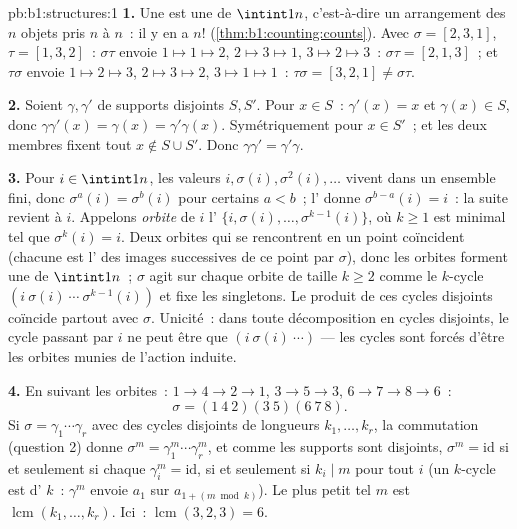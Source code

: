 \begin{solution}{pb:b1:structures:1}
\textbf{1.} Une  est une  de $\intint1n$,
c'est-à-dire un arrangement des $n$ objets pris $n$ à $n$~: il y en a
$n!$ (\cref{thm:b1:counting:counts}). Avec $\sigma = [2,3,1]$, $\tau =
[1,3,2]$~: $\sigma\tau$ envoie $1 \mapsto 1 \mapsto 2$, $2 \mapsto 3
\mapsto 1$, $3 \mapsto 2 \mapsto 3$~: $\sigma\tau = [2,1,3]$~; et
$\tau\sigma$ envoie $1 \mapsto 2 \mapsto 3$, $2 \mapsto 3 \mapsto
2$, $3 \mapsto 1 \mapsto 1$~: $\tau\sigma = [3,2,1] \neq
\sigma\tau$.

\textbf{2.} Soient $\gamma, \gamma'$ de supports disjoints $S, S'$.
Pour $x \in S$~: $\gamma'(x) = x$ et $\gamma(x) \in S$, donc
$\gamma\gamma'(x) = \gamma(x) = \gamma'\gamma(x)$. Symétriquement
pour $x \in S'$~; et les deux membres fixent tout $x \notin S \cup S'$.
Donc $\gamma\gamma' = \gamma'\gamma$.

\textbf{3.} Pour $i \in \intint1n$, les valeurs $i, \sigma(i),
\sigma^2(i), \dots$ vivent dans un ensemble fini, donc $\sigma^a(i) =
\sigma^b(i)$ pour certains $a < b$~; l' donne
$\sigma^{b-a}(i) = i$~: la suite revient à $i$. Appelons \emph{orbite}
de $i$ l' $\{i, \sigma(i), \dots, \sigma^{k-1}(i)\}$, où
$k \geq 1$ est minimal tel que $\sigma^k(i) = i$. Deux orbites qui se
rencontrent en un point coïncident (chacune est l' des images
successives de ce point par $\sigma$), donc les orbites forment une
 de $\intint1n$~; $\sigma$ agit sur chaque orbite de taille
$k \geq 2$ comme le $k$-cycle $(i\ \sigma(i)\ \cdots\
\sigma^{k-1}(i))$ et fixe les singletons. Le produit de ces cycles
disjoints coïncide partout avec $\sigma$. Unicité~: dans toute
décomposition en cycles disjoints, le cycle passant par $i$ ne peut
être que $(i\ \sigma(i)\ \cdots)$ --- les cycles sont forcés d'être les
orbites munies de l'action induite.

\textbf{4.} En suivant les orbites~: $1 \to 4 \to 2 \to 1$, $3 \to 5
\to 3$, $6 \to 7 \to 8 \to 6$~:
\[
\sigma = (1\ 4\ 2)(3\ 5)(6\ 7\ 8) .
\]
Si $\sigma = \gamma_1\cdots\gamma_r$ avec des cycles disjoints de
longueurs $k_1, \dots, k_r$, la commutation (question 2) donne
$\sigma^m = \gamma_1^m\cdots\gamma_r^m$, et comme les supports sont
disjoints, $\sigma^m = \mathrm{id}$ si et seulement si chaque
$\gamma_i^m = \mathrm{id}$, si et seulement si $k_i \mid m$ pour tout
$i$ (un $k$-cycle est d'\omterm{def:b1:structures:order}{ordre} $k$~: $\gamma^m$ envoie $a_1$ sur
$a_{1 + (m \bmod k)}$). Le plus petit tel $m$ est
$\operatorname{lcm}(k_1, \dots, k_r)$. Ici~:
$\operatorname{lcm}(3, 2, 3) = 6$.


\end{solution}
